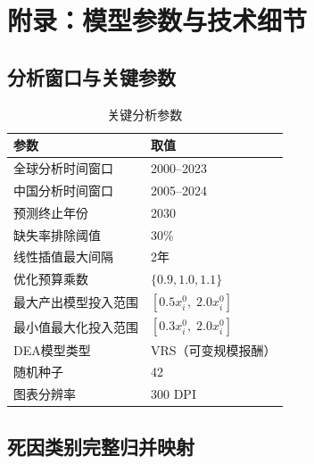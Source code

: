 \documentclass[12pt,a4paper]{ctexart}
\begin{document}
\appendix
\section{附录：模型参数与技术细节}

\subsection{分析窗口与关键参数}

\begin{table}[H]
\centering
\caption{关键分析参数}
\begin{tabular}{ll}
\toprule
\textbf{参数} & \textbf{取值} \\
\midrule
全球分析时间窗口 & 2000--2023 \\
中国分析时间窗口 & 2005--2024 \\
预测终止年份 & 2030 \\
缺失率排除阈值 & 30\% \\
线性插值最大间隔 & 2年 \\
优化预算乘数 & $\{0.9, 1.0, 1.1\}$ \\
最大产出模型投入范围 & $[0.5x_i^0, \; 2.0x_i^0]$ \\
最小值最大化投入范围 & $[0.3x_i^0, \; 2.0x_i^0]$ \\
DEA模型类型 & VRS（可变规模报酬） \\
随机种子 & 42 \\
图表分辨率 & 300 DPI \\
\bottomrule
\end{tabular}
\end{table}

\subsection{死因类别完整归并映射}
\end{document}
